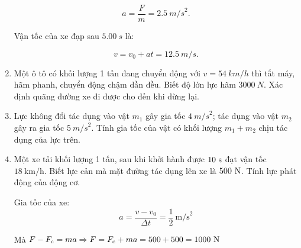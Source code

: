 \begin{enumerate}[label=\bfseries Bài \arabic*:]
{		$$a=\dfrac{F}{m}= \SI{2,5}{m/s}^2.$$
		
		Vận tốc của xe đạp sau $\SI{5,00}{s}$ là:
		
		$$v=v_0+at = \SI{12,5}{m/s}.$$
		
	}
	
	\item {}
	
	{
		
		Một ô tô có khối lượng 1 tấn đang chuyển động với $v = \SI{54}{km/h}$ thì tắt máy, hãm phanh, chuyển động chậm dần đều. Biết độ lớn lực hãm $\SI{3000}{N}$. Xác định quãng đường xe đi được cho đến khi dừng lại.
	}
	
	
	\item {}
	
	{
		
		Lực không đổi tác dụng vào vật $m_1$ gây gia tốc $\SI{4}{m/s}^2$; tác dụng vào vật $m_2$ gây ra gia tốc $\SI{5}{m/s}^2.$ Tính gia tốc của vật có khối lượng $m_1 + m_2$ chịu tác dụng của lực trên.
	}
	
\item {}


{Một xe tải khối lượng 1 tấn, sau khi khởi hành được $10\ \text s$ đạt vận tốc $18\ \text{km/h}$. Biết lực cản mà mặt đường tác dụng lên xe là $500\ \text N$. Tính lực phát động của động cơ.
}

\hideall
{	Gia tốc của xe:
	\[a = \dfrac{v-v_0}{\Delta t} = \dfrac{1}{2}\ \text{m/s}^2\]
	
	Mà $F-F_\text c = ma \Rightarrow F = F_\text c + ma = 500 + 500 = 1000\ \text N$
}

\end{enumerate}
